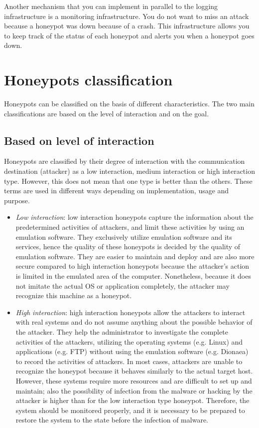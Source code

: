 \documentclass[epsfig,a4paper,11pt,titlepage,oneside,openany]{book}
\begin{document}
\begin{itemize}
Another mechanism that you can implement in parallel to the logging infrastructure is a monitoring infrastructure. You do not want to miss an attack because a honeypot was down because of a crash. This infrastructure allows you to keep track of the status of each honeypot and alerts you when a honeypot goes down.

\chapter{Honeypots classification}

Honeypots can be classified on the basis of different characteristics. The two main classifications are based on the level of interaction and on the goal.

\section{Based on level of interaction}

Honeypots are classified by their degree of interaction with the communication destination (attacker) as a low interaction, medium interaction or  high interaction type. However, this does not mean that one type is better than the others. These terms are used in different ways depending on implementation, usage and purpose.

\begin{itemize}
\item \textit{Low interaction}: low interaction honeypots capture the information about the predetermined activities of attackers, and limit these activities by using an emulation software. They exclusively utilize emulation software and its services, hence the quality of these honeypots is decided by the quality of emulation software. They are easier to maintain and deploy and are also more secure compared to high interaction honeypots because the attacker’s action is limited in the emulated area of the computer. Nonetheless, because it does not imitate the actual OS or application completely, the attacker may recognize this machine as a honeypot.

\item \textit{High interaction}: high interaction honeypots allow the attackers to interact with real systems and do not assume anything about the possible behavior of the attacker. They help the administrator to investigate the complete activities of the attackers, utilizing the operating systems (e.g. Linux) and applications (e.g. FTP) without using the emulation software (e.g. Dionaea) to record the activities of attackers. In most cases, attackers are unable to recognize the honeypot because it behaves similarly to the actual target host. However, these systems require more resources and are difficult to set up and maintain; also the possibility of infection from the malware or hacking by the attacker is higher than for the low interaction type honeypot. Therefore, the system should be monitored properly, and it is necessary to be prepared to restore the system to the state before the infection of malware.


\end{itemize}
\end{itemize}
\end{document}
